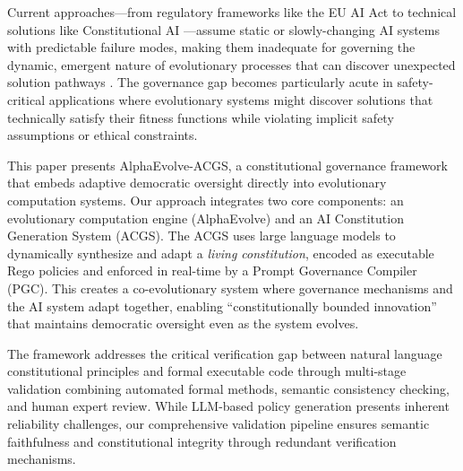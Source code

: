 \documentclass[manuscript,screen,review,anonymous,9pt]{acmart}
\begin{document}
Current approaches---from regulatory frameworks like the EU AI Act to technical solutions like Constitutional AI \cite{Bai2025ConstitutionalAI}---assume static or slowly-changing AI systems with predictable failure modes, making them inadequate for governing the dynamic, emergent nature of evolutionary processes that can discover unexpected solution pathways \cite{StanfordJBLP2024AIGovernanceWeb3, StanfordLaw2025BulletProof}. The governance gap becomes particularly acute in safety-critical applications where evolutionary systems might discover solutions that technically satisfy their fitness functions while violating implicit safety assumptions or ethical constraints.

This paper presents AlphaEvolve-ACGS, a constitutional governance framework that embeds adaptive democratic oversight directly into evolutionary computation systems. Our approach integrates two core components: an evolutionary computation engine (AlphaEvolve) and an AI Constitution Generation System (ACGS). The ACGS uses large language models to dynamically synthesize and adapt a \textit{living constitution}, encoded as executable Rego policies and enforced in real-time by a Prompt Governance Compiler (PGC). This creates a co-evolutionary system where governance mechanisms and the AI system adapt together, enabling ``constitutionally bounded innovation'' that maintains democratic oversight even as the system evolves.

The framework addresses the critical verification gap between natural language constitutional principles and formal executable code through multi-stage validation combining automated formal methods, semantic consistency checking, and human expert review. While LLM-based policy generation presents inherent reliability challenges, our comprehensive validation pipeline ensures semantic faithfulness and constitutional integrity through redundant verification mechanisms.
\end{document}

